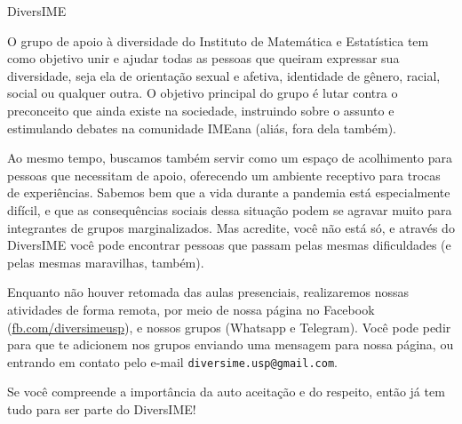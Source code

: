 \begin{subsecao}{DiversIME}


O grupo de apoio à diversidade do Instituto de Matemática e Estatística tem como
objetivo unir e ajudar todas as pessoas que queiram expressar sua diversidade,
seja ela de orientação sexual e afetiva, identidade de gênero, racial, social ou
qualquer outra. O objetivo principal do grupo é lutar contra o preconceito que
ainda existe na sociedade, instruindo sobre o assunto e estimulando debates na
comunidade IMEana (aliás, fora dela também).

Ao mesmo tempo, buscamos também servir como um espaço de acolhimento para pessoas
que necessitam de apoio, oferecendo um ambiente receptivo para trocas de experiências.
Sabemos bem que a vida durante a pandemia está especialmente difícil, e que as
consequências sociais dessa situação podem se agravar muito para integrantes de grupos
marginalizados. Mas acredite, você não está só, e através do DiversIME você pode
encontrar pessoas que passam pelas mesmas dificuldades (e pelas mesmas maravilhas, também).

Enquanto não houver retomada das aulas presenciais, realizaremos nossas atividades
de forma remota, por meio de nossa página no Facebook (\url{fb.com/diversimeusp}),
e nossos grupos (Whatsapp e Telegram). Você pode pedir para que te adicionem nos grupos
enviando uma mensagem para nossa página, ou entrando em contato pelo e-mail
{\tt diversime.usp@gmail.com}.

Se você compreende a importância da auto aceitação e do respeito, então já tem tudo
para ser parte do DiversIME!

\end{subsecao}
